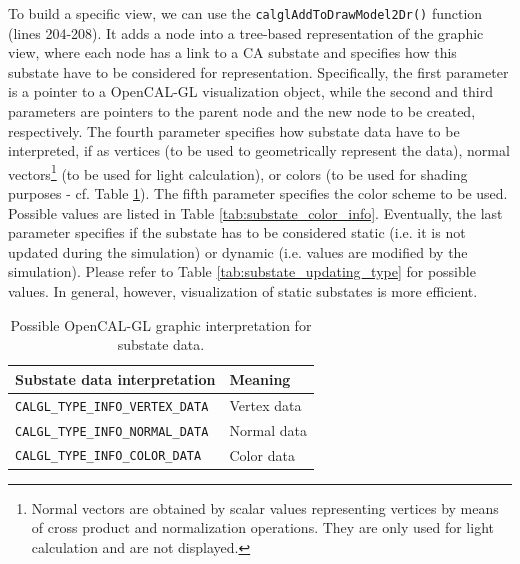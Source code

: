 To build a specific view, we can use the
\verb'calglAddToDrawModel2Dr()' function (lines 204-208). It adds a
node into a tree-based representation of the graphic view, where each
node has a link to a CA substate and specifies how this substate have
to be considered for representation. Specifically, the first parameter
is a pointer to a OpenCAL-GL visualization object, while the second
and third parameters are pointers to the parent node and the new node
to be created, respectively. The fourth parameter specifies how
substate data have to be interpreted, if as vertices (to be used to
geometrically represent the data), normal vectors\footnote{Normal
  vectors are obtained by scalar values representing vertices by means
  of cross product and normalization operations. They are only used
  for light calculation and are not displayed.} (to be used for light
calculation), or colors (to be used for shading purposes - cf. Table
\ref{tab:substate_type_info}). The fifth parameter specifies the color
scheme to be used. Possible values are listed in Table
\ref{tab:substate_color_info}. Eventually, the last parameter
specifies if the substate has to be considered static (i.e. it is not
updated during the simulation) or dynamic (i.e. values are modified by
the simulation). Please refer to Table
\ref{tab:substate_updating_type} for possible values. In general,
however, visualization of static substates is more efficient.

\begin{table}
  \centering
  \small
  \begin{tabular}{l|l}
    \hline
    Substate data interpretation & Meaning\\
    \hline
    \hline
    \verb'CALGL_TYPE_INFO_VERTEX_DATA' & Vertex data\\
    \verb'CALGL_TYPE_INFO_NORMAL_DATA' & Normal data\\
    \verb'CALGL_TYPE_INFO_COLOR_DATA'  & Color data\\
    \hline
  \end{tabular}
  \caption{Possible OpenCAL-GL graphic interpretation for substate data.}
  \label{tab:substate_type_info}
\end{table}

